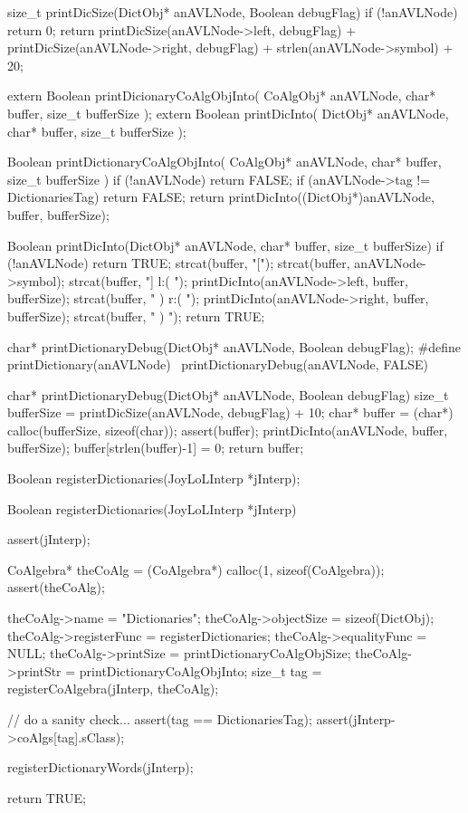 size_t printDicSize(DictObj* anAVLNode, Boolean debugFlag) {
  if (!anAVLNode) return 0;
  return printDicSize(anAVLNode->left, debugFlag)
    + printDicSize(anAVLNode->right, debugFlag)
    + strlen(anAVLNode->symbol) + 20;
}
\stopCCode

\startCHeader
extern Boolean printDicionaryCoAlgObjInto(
  CoAlgObj* anAVLNode, char* buffer, size_t bufferSize
);
extern Boolean printDicInto(
  DictObj* anAVLNode, char* buffer, size_t bufferSize
);
\stopCHeader

\startCCode
Boolean printDictionaryCoAlgObjInto(
  CoAlgObj* anAVLNode, char* buffer, size_t bufferSize
) {
  if (!anAVLNode) return FALSE;
  if (anAVLNode->tag != DictionariesTag) return FALSE;
  return printDicInto((DictObj*)anAVLNode, buffer, bufferSize);
}

Boolean printDicInto(DictObj* anAVLNode, char* buffer, size_t bufferSize) {
  if (!anAVLNode) return TRUE;
  strcat(buffer, "[");
  strcat(buffer, anAVLNode->symbol);
  strcat(buffer, "] l:( ");
  printDicInto(anAVLNode->left, buffer, bufferSize);
  strcat(buffer, " ) r:( ");
  printDicInto(anAVLNode->right, buffer, bufferSize);
  strcat(buffer, " ) ");
  return TRUE;
}
\stopCCode

\startCHeader
char* printDictionaryDebug(DictObj* anAVLNode, Boolean debugFlag);
#define printDictionary(anAVLNode) \
  printDictionaryDebug(anAVLNode, FALSE)
\stopCHeader

\startCCode
char* printDictionaryDebug(DictObj* anAVLNode, Boolean debugFlag) {
  size_t bufferSize = printDicSize(anAVLNode, debugFlag) + 10;
  char* buffer = (char*) calloc(bufferSize, sizeof(char));
  assert(buffer);
  printDicInto(anAVLNode, buffer, bufferSize);
  buffer[strlen(buffer)-1] = 0;
  return buffer;
}
\stopCCode

\startTestSuite[registerDictionaries]

\startCHeader
Boolean registerDictionaries(JoyLoLInterp *jInterp);
\stopCHeader

\startCCode
Boolean registerDictionaries(JoyLoLInterp *jInterp) {
  assert(jInterp);
  
  CoAlgebra* theCoAlg    = (CoAlgebra*) calloc(1, sizeof(CoAlgebra));
  assert(theCoAlg);
  
  theCoAlg->name         = "Dictionaries";
  theCoAlg->objectSize   = sizeof(DictObj);
  theCoAlg->registerFunc = registerDictionaries;
  theCoAlg->equalityFunc = NULL;
  theCoAlg->printSize    = printDictionaryCoAlgObjSize;
  theCoAlg->printStr     = printDictionaryCoAlgObjInto;
  size_t tag = registerCoAlgebra(jInterp, theCoAlg);
  
  // do a sanity check...
  assert(tag == DictionariesTag);
  assert(jInterp->coAlgs[tag].sClass);
  
  registerDictionaryWords(jInterp);
  
  return TRUE;
}
\stopCCode

